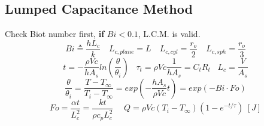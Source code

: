 \documentclass[twocolumn, 12pt]{article}
\begin{document}
\subsection*{Lumped Capacitance Method}
    Check Biot number first, \textbf{if} \(Bi<0.1\), L.C.M. is valid. 
    \begin{equation*}
        Bi \triangleq \frac{hL_c}{k} \hspace{12pt} L_{c,plane} = L \hspace{12pt} L_{c,cyl} = \frac{r_o}{2}  \hspace{12pt} L_{c,sph} = \frac{r_o}{3} 
    \end{equation*}
    \begin{equation*}
        t = -\frac{\rho V c}{hA_s} ln\left(\frac{\theta}{\theta_i}\right) \hspace{10pt} \tau_t = \rho V c \frac{1}{hA_s} = C_t R_t \hspace{10pt} L_c = \frac{V}{A_s}
    \end{equation*}
    \begin{equation*}
        \frac{\theta}{\theta_i} = \frac{T-T_\infty}{T_i-T_\infty} = exp\left(-\frac{hA_s}{\rho V c} t \right) = exp(-Bi\cdot Fo)
    \end{equation*}
    \begin{equation*}
        Fo = \frac{\alpha t}{L_c^2}= \frac{k t}{\rho c_p L_c^2} \hspace{15pt} Q = \rho Vc (T_i-T_\infty)(1-e^{-t/\tau}) \hspace{3pt} [J]
    \end{equation*}
    
\end{document}
